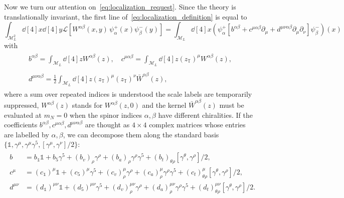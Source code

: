\documentclass[a4paper, 11pt]{article}
\newcommand{\id}{\mathds{1}}								%
\newcommand{\loc}{\mathcal{L}}								%
\newcommand{\torus}{{\scriptstyle{\mathbb{T}}}}				%
\theoremstyle{thm}
\begin{document}
Now we turn our attention on~\eqref{eq:localization_request}. Since the theory is translationally invariant, the first line of~\eqref{eq:localization_definition} is equal to
\begin{equation}
\int_{\mathcal{M}_L^2} \!\! \dd[4]{x} \dd[4]{y} \loc \left[ W^{\alpha \beta}(x,y) \, \psi^+_\alpha(x) \psi^-_\beta(y) \right] =
\int_{\mathcal{M}_L} \! \dd[4]{x} (\psi^+_\alpha [b^{\alpha \beta} + c^{\mu \alpha \beta} \partial_\mu + d^{\mu \nu \alpha \beta} \partial_\mu \partial_\nu] \psi^-_\beta)(x)
\end{equation}
with
\begin{gather*}
\begin{split}
b^{\alpha \beta} = \int_{\mathcal{M}_L} \dd[4]{z} W^{\alpha \beta}(z), \! \quad c^{\mu \alpha \beta} = \int_{\mathcal{M}_L} \dd[4]{z} (z_\torus)^\mu W^{\alpha \beta}(z),
\end{split} \\
\begin{split}
d^{\mu \nu \alpha \beta} = \frac{1}{2} \int_{\mathcal{M}_L} \dd[4]{z} (z_\torus)^\mu (z_\torus)^\nu \bar{W}^{\alpha \beta}(z),
\end{split}
\end{gather*}
where a sum over repeated indices is understood the scale labels are temporarily suppressed, $W^{\alpha \beta}(z)$ stands for $W^{\alpha \beta}(z, 0)$ and the kernel $\bar{W}^{\alpha \beta}(z)$ must be evaluated at $m_N = 0$ when the spinor indices $\alpha, \beta$ have different chiralities. If the coefficients $b^{\alpha \beta}, c^{\mu \alpha \beta}, d^{\mu \nu \alpha \beta}$ are thought as $4 \times 4$ complex matrices whose entries are labelled by $\alpha, \beta$, we can decompose them along the standard basis $\lbrace \id, \gamma^\mu, \gamma^\mu \gamma^5, [\gamma^\mu, \gamma^\nu]/2 \rbrace$:
\begin{align}
\label{eq:gamma_matrices_base_decomposition}
\begin{split}
b & = b_\id \id + b_5 \gamma^5 + (b_v)_\rho \gamma^\rho + (b_a)_\rho \gamma^\rho \gamma^5 + (b_t)_{\theta \rho} [\gamma^\theta, \gamma^\rho]/2, \\
c^\mu & = (c_\id)^\mu \id + (c_5)^\mu \gamma^5 + (c_v)_\rho^\mu \gamma^\rho + (c_a)_\rho^\mu \gamma^\rho \gamma^5 + (c_t)_{\theta \rho}^\mu [\gamma^\theta, \gamma^\rho]/2, \\
d^{\mu \nu} & = (d_\id)^{\mu \nu} \id + (d_5)^{\mu \nu} \gamma^5 + (d_v)_\rho^{\mu \nu} \gamma^\rho + (d_a)_\rho^{\mu \nu} \gamma^\rho \gamma^5 + (d_t)_{\theta \rho}^{\mu \nu} [\gamma^\theta, \gamma^\rho]/2.
\end{split}
\end{align}
\end{document}
